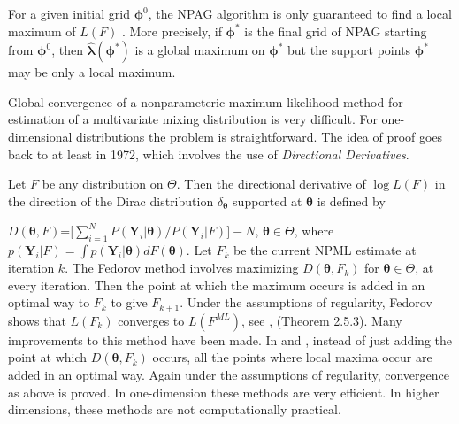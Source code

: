 %
%
 
For a given initial grid $\bm{\phi}^0$, the NPAG algorithm is only guaranteed to find a local maximum of $L(F)$ . More precisely, 
if  $\bm{\phi}^{*}$ is the final grid of NPAG starting from $\bm{\phi}^0$, then $\bm{\hat\lambda}(\bm{\phi}^{*})$
is a global maximum on $\bm{\phi}^{*}$ but  the support points $\bm{\phi}^{*}$ may be only a local maximum.

Global convergence of a nonparameteric maximum likelihood method for estimation of a multivariate mixing distribution is very difficult.  
For one-dimensional distributions the problem is straightforward. 
The idea of proof goes back to at least \citet{Fedorov1972} in 1972, which involves the use of {\em Directional Derivatives}. 

Let $F$ be any distribution on $\Theta$.  Then the directional derivative of $\log L(F)$ in the direction of the Dirac distribution  $\delta_{\bm{\theta}}$  supported at $\bm{\theta}$ is defined by

$D(\bm{\theta},F)$=[$\sum_{i = 1}^N P(\bm{Y}_i \vert \bm{\theta}) /P(\bm{Y}_i \vert F )] - N$, $\bm{\theta} \in \Theta $, 
where
$p(\bm{Y}_i \vert F ) = \int p(\bm{Y}_i \vert \bm{\theta} ) dF(\bm{\theta})$. 
Let $F_k$ be the current NPML estimate at iteration $k$. The Fedorov method involves maximizing $D(\bm{\theta},F_k)$  for ${\bm{\theta} \in \Theta}$, at every iteration. Then the point at which the maximum occurs is added in an optimal way to $F_k$ to give $F_{k+1}$. Under the assumptions of regularity, Fedorov shows that 
$L(F_k)$ converges to $L(F^{ML})$, see \citet{Fedorov1972}, (Theorem 2.5.3).  Many improvements to this method have been made. In  \citet{Lesperance1992} and \citet{Wang2015}, instead of just adding the point at which $D(\bm{\theta},F_k)$ occurs, all the points where local maxima occur are added in an optimal way.
Again under the assumptions of regularity, convergence as above is proved.
In one-dimension these methods are very efficient. In higher dimensions, these methods are not computationally practical. 


